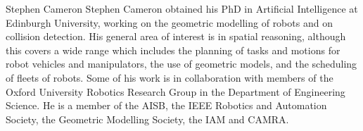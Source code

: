\documentclass[10pt,twocolumn,twoside]{IEEEtran}
\begin{document}
\begin{IEEEbiography}{Stephen Cameron}
Stephen Cameron obtained his PhD in Artificial Intelligence at Edinburgh University, working on the geometric modelling of robots and on collision detection. His general area of interest is in spatial reasoning, although this covers a wide range which includes the planning of tasks and motions for robot vehicles and manipulators, the use of geometric models, and the scheduling of fleets of robots. Some of his work is in collaboration with members of the Oxford University Robotics Research Group in the Department of Engineering Science. He is a member of the AISB, the IEEE Robotics and Automation Society, the Geometric Modelling Society, the IAM and CAMRA.
\end{IEEEbiography}
\end{document}
